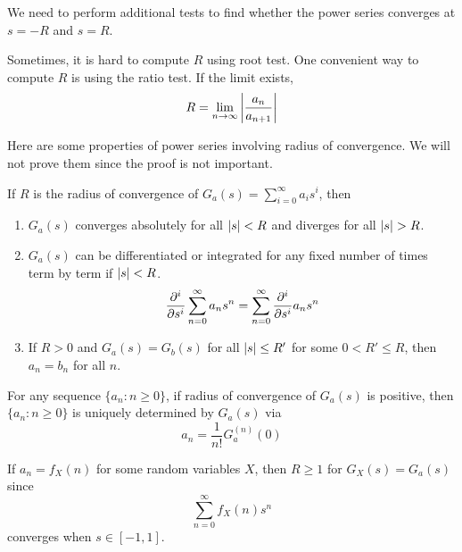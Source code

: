 \documentclass{huhtakm-template-book}
\begin{document}
\begin{rem}
    We need to perform additional tests to find whether the power series converges at $s=-R$ and $s=R$.
\end{rem}
\begin{rem}
    Sometimes, it is hard to compute $R$ using root test. One convenient way to compute $R$ is using the ratio test. If the limit exists,
    \begin{equation*}
        R=\lim_{n\to\infty}\left|{\frac{a_{n}}{a_{n+1}}}\right|
    \end{equation*}
\end{rem}
Here are some properties of power series involving radius of convergence. We will not prove them since the proof is not important.
\begin{thm}
    If $R$ is the radius of convergence of $G_{a}(s)=\sum_{i=0}^{\infty}a_{i}s^{i}$, then
    \begin{enumerate}
        \item $G_{a}(s)$ converges absolutely for all $\left|{s}\right|<R$ and diverges for all $\abs{s}>R$.
        \item $G_{a}(s)$ can be differentiated or integrated for any fixed number of times term by term if $\left|{s}\right|<R$.
        \begin{equation*}
            \pdv*[order={i}]{\sum_{n=0}^{\infty}a_{n}s^{n}}{s}=\sum_{n=0}^{\infty}\pdv*[order={i}]{a_{n}s^{n}}{s}
        \end{equation*}
        \item If $R>0$ and $G_{a}(s)=G_{b}(s)$ for all $\left|{s}\right|\leq R'$ for some $0<R'\leq R$, then $a_{n}=b_{n}$ for all $n$.
    \end{enumerate}
\end{thm}
\begin{rem}
    For any sequence $\{a_{n}:n\geq 0\}$, if radius of convergence of $G_{a}(s)$ is positive, then $\{a_{n}:n\geq 0\}$ is uniquely determined by $G_{a}(s)$ via
    \begin{equation*}
        a_{n}=\frac{1}{n!}G_{a}^{(n)}(0)
    \end{equation*}
\end{rem}
\begin{rem}
    If $a_{n}=f_{X}(n)$ for some random variables $X$, then $R\geq 1$ for $G_{X}(s)=G_{a}(s)$ since
    \begin{equation*}
        \sum_{n=0}^{\infty}f_{X}(n)s^{n}
    \end{equation*}
    converges when $s\in[-1,1]$.
\end{rem}
\end{document}
